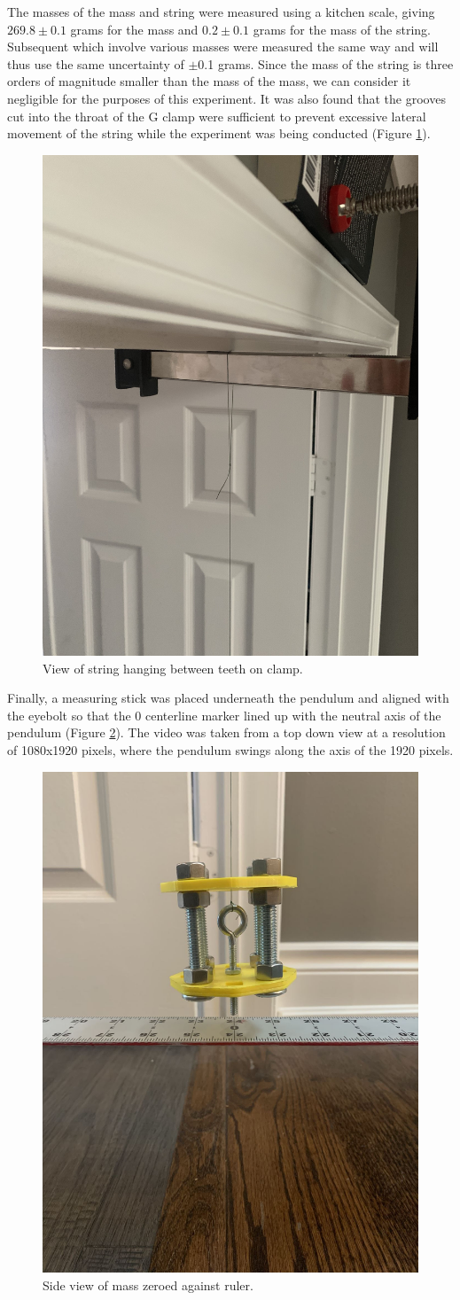\documentclass[11pt]{article}
\begin{document}
        The masses of the mass and string were measured using a kitchen scale, giving $269.8 \pm 0.1$ grams for the mass and $0.2 \pm 0.1$ grams for the mass of the string. Subsequent which involve various masses were measured the same way and will thus use the same uncertainty of $\pm$0.1 grams. Since the mass of the string is three orders of magnitude smaller than the mass of the mass, we can consider it negligible for the purposes of this experiment.
        It was also found that the grooves cut into the throat of the G clamp were sufficient to prevent excessive lateral movement of the string while the experiment was being conducted (Figure \ref{fig:clamp}).
        \begin{figure}[H]
            \centering\includegraphics[angle = 270, width=.45\linewidth]{clampView.jpg}
            \caption{View of string hanging between teeth on clamp.}
            \label{fig:clamp}
        \end{figure}

       Finally, a measuring stick was placed underneath the pendulum and aligned with the eyebolt so that the 0 centerline marker lined up with the neutral axis of the pendulum (Figure \ref{fig:zeroed}). The video was taken from a top down view at a resolution of 1080x1920 pixels, where the pendulum swings along the axis of the 1920 pixels.

        \begin{figure}[H]
            \centering\includegraphics[width = 0.4\linewidth]{zeroed.jpg}
            \caption{Side view of mass zeroed against ruler.}
            \label{fig:zeroed}
        \end{figure}
\end{document}
